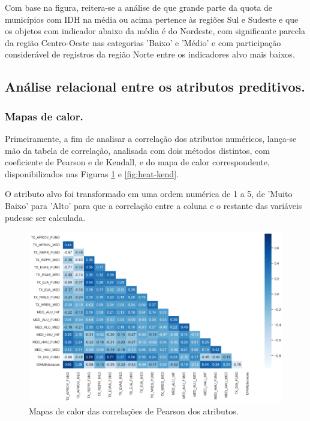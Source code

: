 \par Com base na figura, reitera-se a análise de que grande parte da quota de municípios com IDH na média ou acima pertence às regiões Sul e Sudeste e que os objetos com indicador abaixo da média é do Nordeste, com significante parcela da região Centro-Oeste nas categorias 'Baixo' e 'Médio' e com participação considerável de registros da região Norte entre os indicadores alvo mais baixos.

\subsection{Análise relacional entre os atributos preditivos.}

\subsubsection{Mapas de calor.}
\label{heat-sec}

\par Primeiramente, a fim de analisar a correlação dos atributos numéricos, lança-se mão da tabela de correlação, analisada com dois métodos distintos, com coeficiente de Pearson e de Kendall, e do mapa de calor correspondente, disponibilizados nas Figuras \ref{fig:heat-pear} e \ref{fig:heat-kend}.

\par O atributo alvo foi transformado em uma ordem numérica de 1 a 5, de 'Muito Baixo' para 'Alto' para que a correlação entre a coluna e o restante das variáveis pudesse ser calculada.

\begin{figure}
    \centering
    \includegraphics[width=1\linewidth]{Graphics/HeatMapPearson.png}
    \caption{Mapas de calor das correlações de Pearson dos atributos.}
    \label{fig:heat-pear}
\end{figure}

